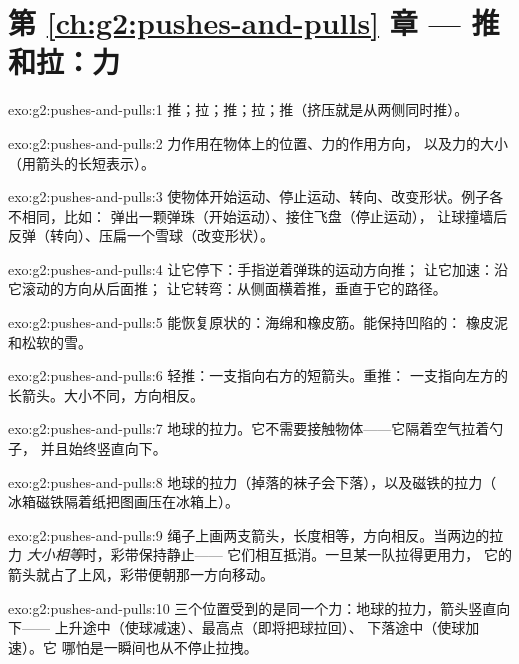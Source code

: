 \section*{第 \ref{ch:g2:pushes-and-pulls} 章 --- 推和拉：力}

\begin{solution}{exo:g2:pushes-and-pulls:1}
推；拉；推；拉；推（挤压就是从两侧同时推）。
\end{solution}

\begin{solution}{exo:g2:pushes-and-pulls:2}
力作用在物体上的位置、力的作用方向，
以及力的大小（用箭头的长短表示）。
\end{solution}

\begin{solution}{exo:g2:pushes-and-pulls:3}
使物体开始运动、停止运动、转向、改变形状。例子各不相同，比如：
弹出一颗弹珠（开始运动）、接住飞盘（停止运动），
让球撞墙后反弹（转向）、压扁一个雪球（改变形状）。
\end{solution}

\begin{solution}{exo:g2:pushes-and-pulls:4}
让它停下：手指逆着弹珠的运动方向推；
让它加速：沿它滚动的方向从后面推；
让它转弯：从侧面横着推，垂直于它的路径。
\end{solution}

\begin{solution}{exo:g2:pushes-and-pulls:5}
能恢复原状的：海绵和橡皮筋。能保持凹陷的：
橡皮泥和松软的雪。
\end{solution}

\begin{solution}{exo:g2:pushes-and-pulls:6}
轻推：一支指向右方的短箭头。重推：
一支指向左方的长箭头。大小不同，方向相反。
\end{solution}

\begin{solution}{exo:g2:pushes-and-pulls:7}
地球的拉力。它不需要接触物体——它隔着空气拉着勺子，
并且始终竖直向下。
\end{solution}

\begin{solution}{exo:g2:pushes-and-pulls:8}
地球的拉力（掉落的袜子会下落），以及磁铁的拉力（
冰箱磁铁隔着纸把图画压在冰箱上）。
\end{solution}

\begin{solution}{exo:g2:pushes-and-pulls:9}
绳子上画两支箭头，长度相等，方向相反。当两边的拉力
\emph{大小相等}时，彩带保持静止——
它们相互抵消。一旦某一队拉得更用力，
它的箭头就占了上风，彩带便朝那一方向移动。
\end{solution}

\begin{solution}{exo:g2:pushes-and-pulls:10}
三个位置受到的是同一个力：地球的拉力，箭头竖直向下——
上升途中（使球减速）、最高点（即将把球拉回）、
下落途中（使球加速）。它
哪怕是一瞬间也从不停止拉拽。
\end{solution}
